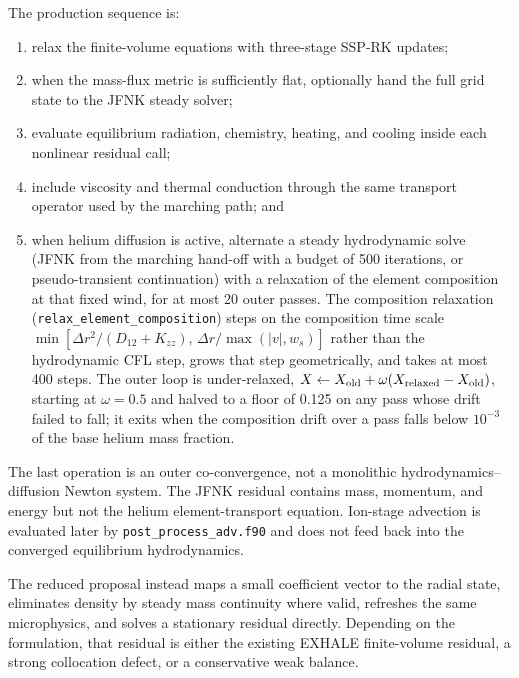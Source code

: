 \documentclass[english,a4paper]{my_memo}
\newcommand{\code}[1]{\texttt{#1}}
\begin{document}
The production sequence is:
\begin{enumerate}
\item relax the finite-volume equations with three-stage SSP-RK updates;
\item when the mass-flux metric is sufficiently flat, optionally hand the full
  grid state to the JFNK steady solver;
\item evaluate equilibrium radiation, chemistry, heating, and cooling inside
  each nonlinear residual call;
\item include viscosity and thermal conduction through the same transport
  operator used by the marching path; and
\item when helium diffusion is active, alternate a steady hydrodynamic solve
  (JFNK from the marching hand-off with a budget of 500 iterations, or
  pseudo-transient continuation) with a relaxation of the element composition
  at that fixed wind, for at most 20 outer passes.  The composition relaxation
  (\code{relax\_element\_composition}) steps on the composition time scale
  \(\min[\Delta r^2/(D_{12}+K_{zz}),\,\Delta r/\max(|v|,w_s)]\) rather than
  the hydrodynamic CFL step, grows that step geometrically, and takes at most
  400 steps.  The outer loop is under-relaxed,
  \(X\leftarrow X_{\rm old}+\omega(X_{\rm relaxed}-X_{\rm old})\), starting
  at \(\omega=0.5\) and halved to a floor of 0.125 on any pass whose drift
  failed to fall; it exits when the composition drift over a pass falls below
  \(10^{-3}\) of the base helium mass fraction.
\end{enumerate}
The last operation is an outer co-convergence, not a monolithic
hydrodynamics--diffusion Newton system.  The JFNK residual contains mass,
momentum, and energy but not the helium element-transport equation.  Ion-stage
advection is evaluated later by \code{post\_process\_adv.f90} and does not feed
back into the converged equilibrium hydrodynamics.

The reduced proposal instead maps a small coefficient vector to the radial
state, eliminates density by steady mass continuity where valid, refreshes the
same microphysics, and solves a stationary residual directly.  Depending on the
formulation, that residual is either the existing EXHALE finite-volume residual,
a strong collocation defect, or a conservative weak balance.
\end{document}
